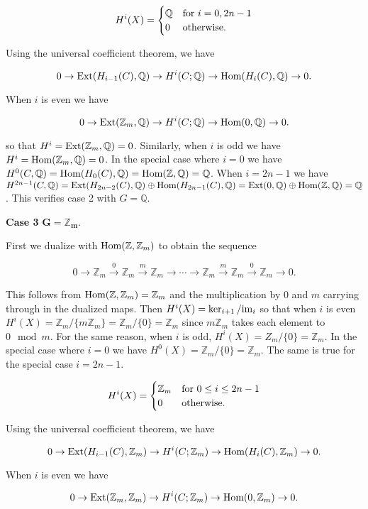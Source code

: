 \documentclass{article}
\newcommand{\Z}{\mathbb{Z}}
\newcommand{\Q}{\mathbb{Q}}
\newcommand{\Hom}{\textnormal{Hom}}
\newcommand{\Ext}{\textnormal{Ext}}
\newcommand{\im}{\textnormal{im}}
\begin{document}
\[H^{i}(X) = \begin{cases} \Q & \textnormal{for } i=0, 2n-1\\
0 & \textnormal{otherwise}. \end{cases}\]
\medskip

Using the universal coefficient theorem, we have

$$0\to \Ext(H_{i-1}(C), \Q)\to H^{i}(C;\Q)\to \Hom(H_{i}(C),\Q)\to 0.$$

When $i$ is even we have

$$0\to \Ext(\Z_{m}, \Q)\to H^{i}(C;\Q)\to \Hom(0,\Q)\to 0.$$

so that $H^{i} = \Ext(\Z_{m},\Q) = 0$. Similarly, when $i$ is odd we have $H^{i} = \Hom(\Z_{m},\Q) = 0$. In the special case where $i = 0$ we have $H^{0}(C, \Q) = \Hom(H_{0}(C), \Q) = \Hom(\Z, \Q) = \Q$. When $i = 2n-1$ we have $H^{2n-1}(C, \Q) = \Ext(H_{2n-2}(C), \Q)\oplus\Hom(H_{2n-1}(C), \Q) = \Ext(0, \Q)\oplus\Hom(\Z, \Q) = \Q$. This verifies case 2 with $G = \Q$.
\bigskip

\textbf{Case 3} $\mathbf{G = \Z_{m}}$.

First we dualize with $\Hom(\Z, \Z_{m})$ to obtain the sequence

$$0\to \Z_{m}\xrightarrow{0} \Z_{m}\xrightarrow{m} \Z_{m}\to \cdots \to \Z_{m} \xrightarrow{m}\Z_{m} \xrightarrow{0}\Z_{m}\to 0.$$

This follows from $\Hom(\Z, \Z_{m}) = \Z_{m}$ and the multiplication by 0 and $m$ carrying through in the dualized maps. Then $H^{i}(X) = \ker_{i+1}/\im_{i}$ so that when $i$ is even $H^{i}(X) = \Z_{m}/\{m\Z_{m}\} = \Z_{m}/\{0\} = \Z_{m}$ since $m\Z_{m}$ takes each element to $0\mod m$. For the same reason, when $i$ is odd, $H^{i}(X) = Z_{m}/\{0\} = \Z_{m}$. In the special case where $i = 0$ we have $H^{0}(X) = \Z_{m}/\{0\} = \Z_{m}$. The same is true for the special case $i = 2n-1$.

\[H^{i}(X) = \begin{cases} \Z_{m} & \textnormal{for } 0\leq i\leq 2n-1\\
0 & \textnormal{otherwise}. \end{cases}\]
\medskip

Using the universal coefficient theorem, we have

$$0\to \Ext(H_{i-1}(C), \Z_{m})\to H^{i}(C;\Z_{m})\to \Hom(H_{i}(C),\Z_{m})\to 0.$$

When $i$ is even we have

$$0\to \Ext(\Z_{m}, \Z_{m})\to H^{i}(C;\Z_{m})\to \Hom(0,\Z_{m})\to 0.$$
\end{document}
